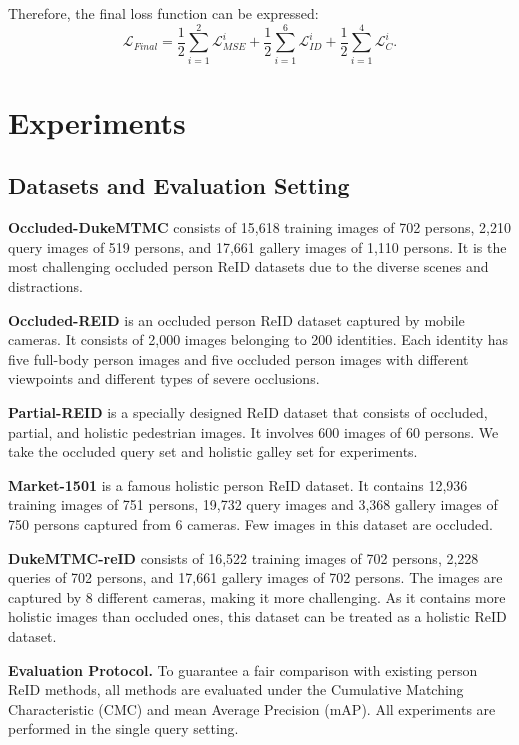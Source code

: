 \documentclass[10pt,twocolumn,letterpaper]{article}
\begin{document}
Therefore, the final loss function can be expressed:
\begin{equation}
    \mathcal{L}_{Final}=\frac{1}{2}\sum_{i=1}^{2}\mathcal{L}_{MSE}^i + \frac{1}{2}\sum_{i=1}^{6}\mathcal{L}_{ID}^i + \frac{1}{2}\sum_{i=1}^{4}\mathcal{L}_{C}^i.
\end{equation}


\section{Experiments}
\subsection{Datasets and Evaluation Setting}
\textbf{Occluded-DukeMTMC} \cite{miao2019pose} consists of 15,618 training images of 702 persons, 2,210 query images of 519 persons, and 17,661 gallery images of 1,110 persons. It is the most challenging occluded person ReID datasets due to the diverse scenes and distractions.

\textbf{Occluded-REID} \cite{zhuo2018occluded}  is an occluded person ReID dataset captured by mobile cameras. It consists of 2,000 images belonging to 200 identities. Each identity has five full-body person images and five occluded person images with different viewpoints and different types of severe occlusions.

\textbf{Partial-REID} \cite{zheng2015partial} is a specially designed ReID dataset that consists of occluded, partial, and holistic pedestrian images. It involves 600 images of 60 persons. We take the occluded query set and holistic galley set for experiments. 

\textbf{Market-1501} \cite{zheng2015scalable} is a famous holistic person ReID dataset. It contains 12,936 training images of 751 persons, 19,732 query images and 3,368 gallery images of 750 persons captured from 6 cameras. Few images in this dataset are occluded. 

\textbf{DukeMTMC-reID} \cite{zheng2017unlabeled} consists of 16,522 training images of 702 persons, 2,228 queries of 702 persons, and 17,661 gallery images of 702 persons. The images are captured by 8 different cameras, making it more challenging. As it contains more holistic images than occluded ones, this dataset can be treated as a holistic ReID dataset.

\textbf{Evaluation Protocol.}
To guarantee a fair comparison with existing person ReID methods, all methods are evaluated under the Cumulative Matching Characteristic (CMC) and mean Average Precision (mAP). All experiments are performed in the single query setting.
\end{document}
